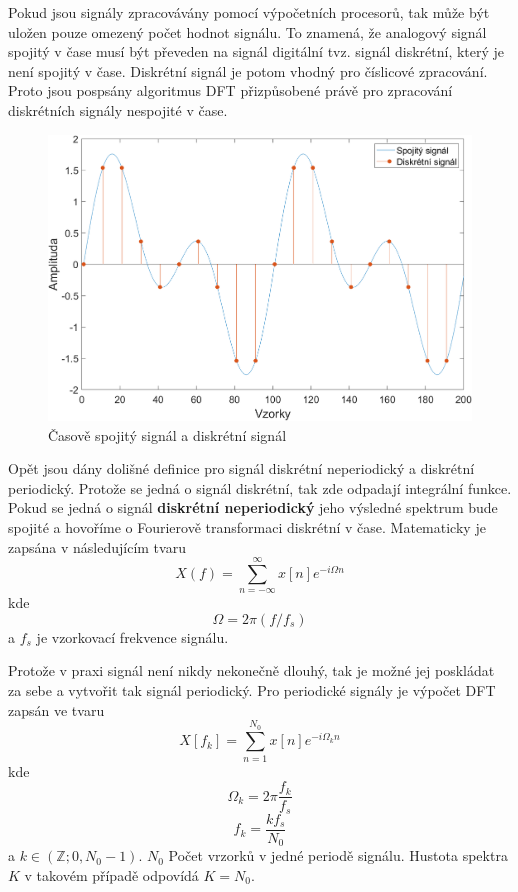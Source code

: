 \cite{strichartz2003guide}
\cite{bracewell1978fourier}

  Pokud jsou signály zpracovávány pomocí výpočetních procesorů,
  tak může být uložen pouze omezený počet hodnot signálu.
  To znamená, že analogový signál spojitý v čase musí být převeden na signál digitální tvz. signál diskrétní, který je není spojitý v čase. 
  Diskrétní signál je potom vhodný pro číslicové zpracování.
  Proto jsou pospsány algoritmus \acs{DFT} přizpůsobené právě pro zpracování diskrétních signály nespojité v čase.

  \begin{figure}[H]
    \centering
    \includegraphics[width = 0.8\linewidth]{obrazky/Discrete_signal.png}
    \caption{Časově spojitý signál a diskrétní signál}
    \label{fig:Discrete_signal}
  \end{figure}

  Opět jsou dány dolišné definice pro signál diskrétní neperiodický a diskrétní periodický. Protože se jedná o signál diskrétní, tak zde odpadají integrální funkce.
  Pokud se jedná o signál \textbf{diskrétní neperiodický} jeho výsledné spektrum bude spojité a hovoříme o Fourierově transformaci diskrétní v čase. Matematicky je zapsána v následujícím tvaru
  \begin{equation}
    X(f) = \sum_{n = -\infty}^{\infty} x[n] e^{-i \Omega n}
    \label{rov:DTFT}
  \end{equation}
  kde
  \begin{equation}
    \Omega = 2 \pi (f/f_s)
  \end{equation}
  a $f_s$ je vzorkovací frekvence signálu.

  Protože v praxi signál není nikdy nekonečně dlouhý, tak je možné jej poskládat za sebe a vytvořit tak signál periodický. Pro periodické signály je výpočet \acs{DFT} zapsán ve tvaru
  \begin{equation}
    X[f_k] = \sum_{n = 1}^{N_0} x[n] e^{-i\Omega_k n}
    \label{rov:DFT}
  \end{equation}
  kde
  \begin{equation}
    \Omega_k = 2 \pi \frac{f_k}{f_s}
  \end{equation}
  \begin{equation}
    f_k = \frac{k f_s}{N_0}
  \end{equation}
  a $k \in(\mathbb{Z}; 0, N_0 -1)$. $N_0$ Počet vrzorků v jedné periodě signálu.
  Hustota spektra $K$ v takovém případě odpovídá $K = N_0$.

